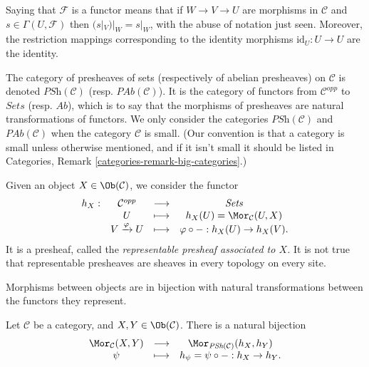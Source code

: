 \medskip\noindent
Saying that $\mathcal{F}$ is a functor means that if
$W \to V \to U$ are morphisms in $\mathcal{C}$ and
$s \in \Gamma(U, \mathcal{F})$ then
$(s|_V)|_W = s |_W$, with the abuse of
notation just seen. Moreover, the restriction mappings corresponding to
the identity morphisms $\text{id}_U : U \to U$ are the identity.

\medskip\noindent
The category of presheaves of sets (respectively of abelian presheaves) on
$\mathcal{C}$ is denoted $\textit{PSh} (\mathcal{C})$ (resp. $\textit{PAb}
(\mathcal{C})$). It is the category of functors from $\mathcal{C}^{opp}$ to
$\textit{Sets}$ (resp. $\textit{Ab}$), which is to say that the morphisms of
presheaves are natural transformations of functors. We only consider the
categories $\textit{PSh}(\mathcal{C})$ and $\textit{PAb}(\mathcal{C})$
when the category $\mathcal{C}$ is small. (Our convention is that a category
is small unless otherwise mentioned, and if it isn't small it should be
listed in Categories, Remark \ref{categories-remark-big-categories}.)

\begin{example}
\label{example-representable-presheaf}
Given an object $X \in \Ob(\mathcal{C})$, we consider the functor
$$
\begin{matrix}
h_X : & \mathcal{C}^{opp} & \longrightarrow & \textit{Sets} \\
& U & \longmapsto & h_X(U) = \Mor_\mathcal{C}(U, X) \\
& V \xrightarrow{\varphi} U & \longmapsto &
\varphi \circ - : h_X(U) \to h_X(V).
\end{matrix}
$$
It is a presheaf, called the {\it representable presheaf associated to $X$.}
It is not true that representable presheaves are sheaves in every topology on
every site.
\end{example}

\begin{lemma}[Yoneda]
\label{lemma-yoneda}
\begin{slogan}
Morphisms between objects are in bijection with natural transformations
between the functors they represent.
\end{slogan}
Let $\mathcal{C}$ be a category, and $X, Y \in
\Ob(\mathcal{C})$. There is a natural bijection
$$
\begin{matrix}
\Mor_\mathcal{C}(X, Y) &
\longrightarrow &
\Mor_{\textit{PSh}(\mathcal{C})} (h_X, h_Y) \\
\psi &
\longmapsto &
h_\psi = \psi \circ - : h_X \to h_Y.
\end{matrix}
$$
\end{lemma}

